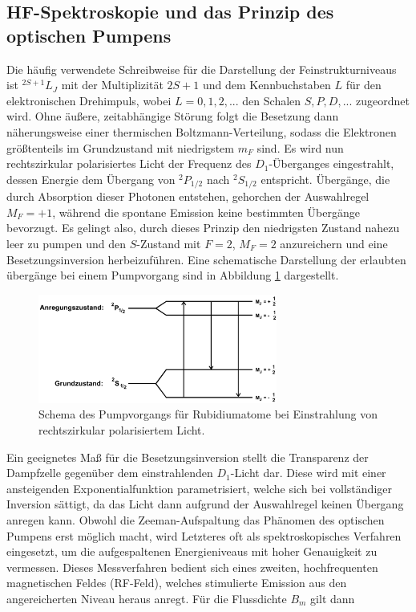 \subsection{HF-Spektroskopie und das Prinzip des optischen Pumpens}
\label{subsec:opticalPump}

Die häufig verwendete Schreibweise für die Darstellung der Feinstrukturniveaus
ist ${}^{2S+1}L_J$ mit der Multiplizität $2S+1$ und dem Kennbuchstaben $L$ für den
elektronischen Drehimpuls, wobei $L=0,1,2,...$ den Schalen $S,P,D,...$ zugeordnet wird.
Ohne äußere, zeitabhängige Störung folgt die Besetzung dann näherungsweise einer thermischen Boltzmann-Verteilung,
sodass die Elektronen größtenteils im Grundzustand mit niedrigstem $m_F$ sind.
Es wird nun rechtszirkular polarisiertes Licht der Frequenz des $D_1$-Überganges eingestrahlt, dessen Energie dem
Übergang von ${}^{2}P_{1/2}$ nach ${}^{2}S_{1/2}$ entspricht. Übergänge, die durch Absorption dieser Photonen
entstehen, gehorchen der Auswahlregel $M_F=+1$, während die spontane Emission keine bestimmten Übergänge
bevorzugt. Es gelingt also, durch dieses Prinzip den niedrigsten Zustand nahezu leer zu pumpen und den
$S$-Zustand mit $F=2$, $M_F=2$ anzureichern und eine Besetzungsinversion herbeizuführen.
Eine schematische Darstellung der erlaubten übergänge bei einem Pumpvorgang sind in Abbildung \ref{fig:pumping}
dargestellt.

\begin{figure}
    \centering
    \includegraphics[width=0.7\textwidth]{images/rechtszirkulareEinstrahlung.png}
    \caption{Schema des Pumpvorgangs für Rubidiumatome bei Einstrahlung von rechtszirkular polarisiertem Licht. \cite{anleitungAlt}}
    \label{fig:pumping}
\end{figure}

Ein geeignetes Maß für die Besetzungsinversion stellt die Transparenz der Dampfzelle gegenüber dem
einstrahlenden $D_1$-Licht dar. Diese wird mit einer ansteigenden Exponentialfunktion parametrisiert,
welche sich bei vollständiger Inversion sättigt, da das Licht dann aufgrund der Auswahlregel keinen
Übergang anregen kann. Obwohl die Zeeman-Aufspaltung das Phänomen des optischen Pumpens erst möglich
macht, wird Letzteres oft als spektroskopisches Verfahren eingesetzt, um die aufgespaltenen
Energieniveaus mit hoher Genauigkeit zu vermessen. Dieses Messverfahren bedient sich eines zweiten,
hochfrequenten magnetischen Feldes (RF-Feld), welches stimulierte Emission aus den angereicherten
Niveau heraus anregt. Für die Flussdichte $B_m$ gilt dann

